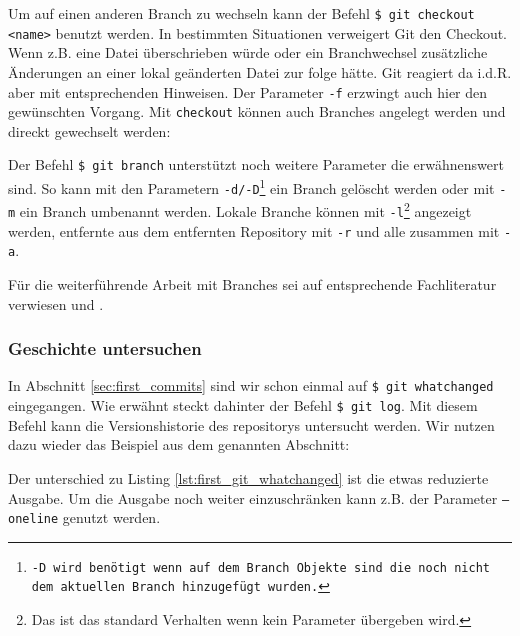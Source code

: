 

Um auf einen anderen Branch zu wechseln kann der Befehl \texttt{\$ git checkout
<name>} benutzt werden. In bestimmten Situationen verweigert Git den Checkout.
Wenn z.B. eine Datei überschrieben würde oder ein Branchwechsel zusätzliche
Änderungen an einer lokal geänderten Datei zur folge hätte. Git reagiert da
i.d.R. aber mit entsprechenden Hinweisen. Der Parameter \texttt{-f} erzwingt
auch hier den gewünschten Vorgang. Mit \texttt{checkout} können auch Branches
angelegt werden und direckt gewechselt werden:



Der Befehl \texttt{\$ git branch} unterstützt noch weitere Parameter die
erwähnenswert sind. So kann mit den Parametern
\texttt{-d/-D}\footnote{\texttt{-D wird benötigt wenn auf dem Branch Objekte
sind die noch nicht dem aktuellen Branch hinzugefügt wurden.}} ein Branch
gelöscht werden oder mit \texttt{-m} ein Branch umbenannt werden. Lokale
Branche können mit \texttt{-l}\footnote{Das ist das standard Verhalten wenn kein
Parameter übergeben wird.} angezeigt werden, entfernte aus dem entfernten
Repository mit \texttt{-r} und alle zusammen mit
\texttt{-a}.\cite[65-67]{gitosp}

Für die weiterführende Arbeit mit Branches sei auf entsprechende Fachliteratur
verwiesen \cite[388-389, 408-415]{cd} und \cite[56-88]{progit}.

\subsubsection{Geschichte untersuchen}\label{sec:arch}
In Abschnitt \ref{sec:first_commits} sind wir schon einmal auf \texttt{\$ git
whatchanged} eingegangen.  Wie erwähnt steckt dahinter der Befehl \texttt{\$
git log}. Mit diesem Befehl kann die Versionshistorie des \glspl{repository}
untersucht werden. Wir nutzen dazu wieder das Beispiel aus dem genannten
Abschnitt:



Der unterschied zu Listing \ref{lst:first_git_whatchanged} ist die etwas
reduzierte Ausgabe. Um die Ausgabe noch weiter einzuschränken kann z.B. der
Parameter \texttt{--oneline} genutzt werden.

